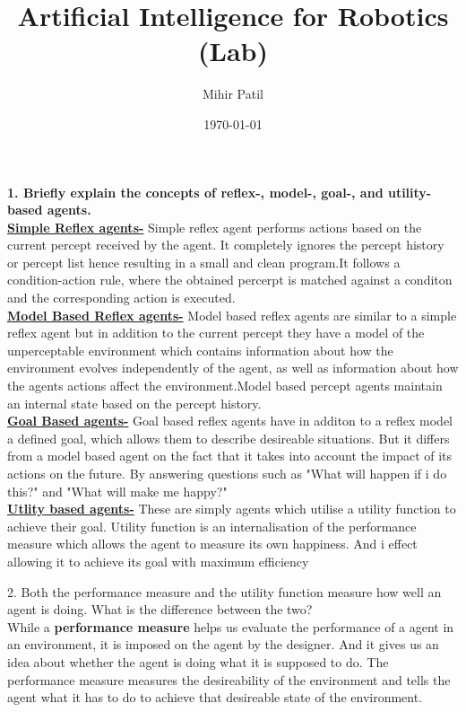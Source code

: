 \documentclass{scrartcl}
\title{Artificial Intelligence for Robotics (Lab)}
\subtitle{\begin{Large}
Assignment 1
\end{Large}}
\date{\today}
\author{Mihir Patil}
\begin{document}
\maketitle
{}
\textbf{1. Briefly explain the concepts of reflex-, model-, goal-, and utility-based agents.}\\

\underline{\textbf{Simple Reflex agents-}} Simple reflex agent performs actions based on the current percept received by the agent. It completely ignores the percept history or percept list hence resulting in a small and clean program.It follows a condition-action rule, where the obtained percerpt is matched against a conditon and the corresponding action is executed.\\

\underline{\textbf{Model Based Reflex agents-}} Model based reflex agents are similar to a simple reflex agent but in addition to the current percept they have a model of the unperceptable environment which contains information about how the environment evolves independently of the agent, as well as information about how the agents actions affect the environment.Model based percept agents maintain an internal state based on the percept history.\\

\underline{\textbf{Goal Based agents-}} Goal based reflex agents have in additon to a reflex model a defined goal, which allows them to describe desireable situations. But it differs from a model based agent on the fact that it takes into account the impact of its actions on the future. By answering questions such as "What will happen if i do this?" and "What will make me happy?"\\

\underline{\textbf{Utlity based agents-}} These are simply agents which utilise a utility function to achieve their goal. Utility function is an internalisation of the performance measure which allows the agent to measure its own happiness. And i effect allowing it to achieve its goal with maximum efficiency
\newpage

2. Both the performance measure and the utility function measure how well an agent is doing. What is the difference between the two?\\

While a \textbf{performance measure} helps us evaluate the performance of a agent in an environment, it is imposed on the agent by the designer. And it gives us an idea about whether the agent is doing what it is supposed to do. The performance measure measures the desireability of the environment and tells the agent what it has to do to achieve that desireable state of the environment.\\
\end{document}
